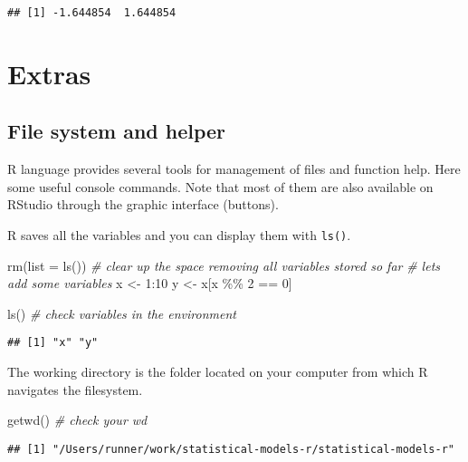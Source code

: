 \documentclass[
  oneside]{book}
\newenvironment{Shaded}{\begin{snugshade}}{\end{snugshade}}
\newcommand{\AttributeTok}[1]{\textcolor[rgb]{0.77,0.63,0.00}{#1}}
\newcommand{\CommentTok}[1]{\textcolor[rgb]{0.56,0.35,0.01}{\textit{#1}}}
\newcommand{\DecValTok}[1]{\textcolor[rgb]{0.00,0.00,0.81}{#1}}
\newcommand{\FunctionTok}[1]{\textcolor[rgb]{0.00,0.00,0.00}{#1}}
\newcommand{\NormalTok}[1]{#1}
\newcommand{\OtherTok}[1]{\textcolor[rgb]{0.56,0.35,0.01}{#1}}
\newcommand{\SpecialCharTok}[1]{\textcolor[rgb]{0.00,0.00,0.00}{#1}}
\begin{document}
\begin{verbatim}
## [1] -1.644854  1.644854
\end{verbatim}

\hypertarget{extras}{%
\section{Extras}\label{extras}}

\hypertarget{file-system-and-helper}{%
\subsection{File system and helper}\label{file-system-and-helper}}

R language provides several tools for management of files and function help.
Here some useful console commands. Note that most of them are also available
on RStudio through the graphic interface (buttons).

R saves all the variables and you can display them with \texttt{ls()}.

\begin{Shaded}
\begin{Highlighting}[]
\FunctionTok{rm}\NormalTok{(}\AttributeTok{list =} \FunctionTok{ls}\NormalTok{()) }\CommentTok{\# clear up the space removing all variables stored so far}
\CommentTok{\# let\textquotesingle{}s add some variables}
\NormalTok{x }\OtherTok{\textless{}{-}} \DecValTok{1}\SpecialCharTok{:}\DecValTok{10}
\NormalTok{y }\OtherTok{\textless{}{-}}\NormalTok{ x[x }\SpecialCharTok{\%\%} \DecValTok{2} \SpecialCharTok{==} \DecValTok{0}\NormalTok{]}

\FunctionTok{ls}\NormalTok{() }\CommentTok{\# check variables in the environment}
\end{Highlighting}
\end{Shaded}

\begin{verbatim}
## [1] "x" "y"
\end{verbatim}

The working directory is the folder located on your computer from which R
navigates the filesystem.

\begin{Shaded}
\begin{Highlighting}[]
\FunctionTok{getwd}\NormalTok{() }\CommentTok{\# check your wd}
\end{Highlighting}
\end{Shaded}

\begin{verbatim}
## [1] "/Users/runner/work/statistical-models-r/statistical-models-r"
\end{verbatim}
\end{document}
